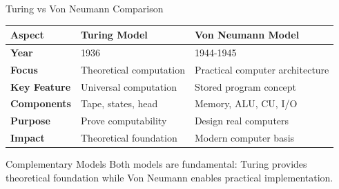 \documentclass[aspectratio=169]{beamer}
\begin{document}
\begin{frame}{Turing vs Von Neumann Comparison}
    \begin{center}
        \begin{tabular}{|p{3cm}|p{5cm}|p{5cm}|}
            \hline
            \textbf{Aspect} & \textbf{Turing Model} & \textbf{Von Neumann Model} \\
            \hline
            \textbf{Year} & 1936 & 1944-1945 \\
            \hline
            \textbf{Focus} & Theoretical computation & Practical computer architecture \\
            \hline
            \textbf{Key Feature} & Universal computation & Stored program concept \\
            \hline
            \textbf{Components} & Tape, states, head & Memory, ALU, CU, I/O \\
            \hline
            \textbf{Purpose} & Prove computability & Design real computers \\
            \hline
            \textbf{Impact} & Theoretical foundation & Modern computer basis \\
            \hline
        \end{tabular}
    \end{center}
    
    \vspace{0.5cm}
    \begin{alertblock}{Complementary Models}
        Both models are fundamental: Turing provides theoretical foundation while Von Neumann enables practical implementation.
    \end{alertblock}
\end{frame}
\end{document}
